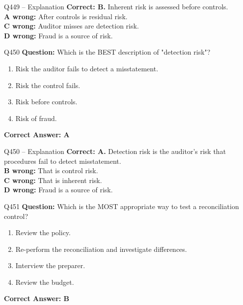 \documentclass[aspectratio=169,10pt]{beamer}
\begin{document}
	\begin{frame}[t]{Q449 -- Explanation}
		\small
		\textbf{Correct: B.} Inherent risk is assessed before controls. \\[4pt]
		\textbf{A wrong:} After controls is residual risk. \\[2pt]
		\textbf{C wrong:} Auditor misses are detection risk. \\[2pt]
		\textbf{D wrong:} Fraud is a source of risk.
	\end{frame}
	
	\begin{frame}[t]{Q450}
		\small
		\textbf{Question:} Which is the BEST description of "detection risk"?
		\begin{enumerate}[label=\Alph*.,itemsep=1pt,topsep=2pt]
			\item Risk the auditor fails to detect a misstatement.
			\item Risk the control fails.
			\item Risk before controls.
			\item Risk of fraud.
		\end{enumerate}
		\vspace{4pt}
		\textbf{Correct Answer: A}
	\end{frame}
	
	\begin{frame}[t]{Q450 -- Explanation}
		\small
		\textbf{Correct: A.} Detection risk is the auditor's risk that procedures fail to detect misstatement. \\[4pt]
		\textbf{B wrong:} That is control risk. \\[2pt]
		\textbf{C wrong:} That is inherent risk. \\[2pt]
		\textbf{D wrong:} Fraud is a source of risk.
	\end{frame}
	
	\begin{frame}[t]{Q451}
		\small
		\textbf{Question:} Which is the MOST appropriate way to test a reconciliation control?
		\begin{enumerate}[label=\Alph*.,itemsep=1pt,topsep=2pt]
			\item Review the policy.
			\item Re-perform the reconciliation and investigate differences.
			\item Interview the preparer.
			\item Review the budget.
		\end{enumerate}
		\vspace{4pt}
		\textbf{Correct Answer: B}
	\end{frame}
	
\end{document}
